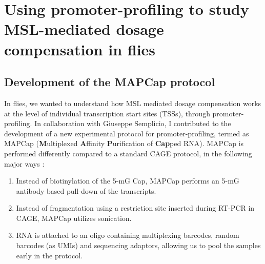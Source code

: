 \documentclass[11pt,twoside]{MPIthesis}
\theoremstyle{definition}
\theoremstyle{definition}
\theoremstyle{definition}
\theoremstyle{remark}
\begin{document}
\section{Using promoter-profiling to study MSL-mediated dosage
compensation in
flies}\label{using-promoter-profiling-to-study-msl-mediated-dosage-compensation-in-flies}

\subsection{Development of the MAPCap
protocol}\label{development-of-the-mapcap-protocol}

In flies, we wanted to understand how MSL mediated dosage compensation
works at the level of individual transcription start sites (TSSs),
through promoter-profiling. In collaboration with Giuseppe Semplicio, I
contributed to the development of a new experimental protocol for
promoter-profiling, termed as MAPCap (\textbf{M}ultiplexed
\textbf{A}ffinity \textbf{P}urification of \textbf{Cap}ped RNA). MAPCap
is performed differently compared to a standard CAGE protocol, in the
following major ways :
\begin{enumerate}
\def\labelenumi{\arabic{enumi}.}
\item
  Instead of biotinylation of the 5-mG Cap, MAPCap performs an 5-mG
  antibody based pull-down of the transcripts.
\item
  Instead of fragmentation using a restriction site inserted during
  RT-PCR in CAGE, MAPCap utilizes sonication.
\item
  RNA is attached to an oligo containing multiplexing barcodes, random
  barcodes (as UMIs) and sequencing adaptors, allowing us to pool the
  samples early in the protocol.
\end{enumerate}
\end{document}
